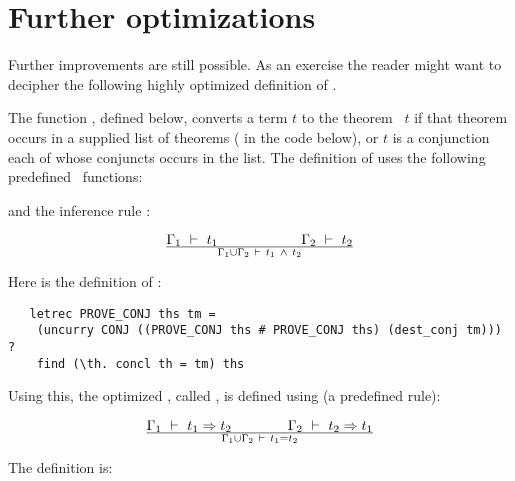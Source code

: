 \section{Further optimizations}

Further improvements are still possible. As an exercise the reader
might want to decipher the following highly optimized definition of
.

The function , defined below, 
converts a term $t$ to the theorem \ml{|-}~$t$
if that theorem occurs in a supplied list of theorems ( in the
code below), or $t$ is a conjunction each of whose conjuncts occurs in
the list. The definition of  uses the following
predefined \ML\ functions:


\noindent and the inference rule :


\[ \Gamma_1\ \vdash\ 
t_1\qquad\qquad\qquad\Gamma_2\ \vdash\  t_2\over \Gamma_1\cup\Gamma_2 \ \vdash\  t_1\ \wedge\ 
t_2 \]


\noindent Here is the definition of :

\begin{hol}\begin{verbatim}
   letrec PROVE_CONJ ths tm =
    (uncurry CONJ ((PROVE_CONJ ths # PROVE_CONJ ths) (dest_conj tm))) ?
    find (\th. concl th = tm) ths
\end{verbatim}\end{hol}

\noindent Using this, the optimized , called
, is defined using  (a predefined rule):


\[ \Gamma_1 \ \vdash\  t_1 \Rightarrow t_2 \qquad\qquad \Gamma_2\ \vdash\  t_2 \Rightarrow t_1\over
\Gamma_1 \cup \Gamma_2 \ \vdash\  t_1 = t_2\]

\noindent The definition is:


